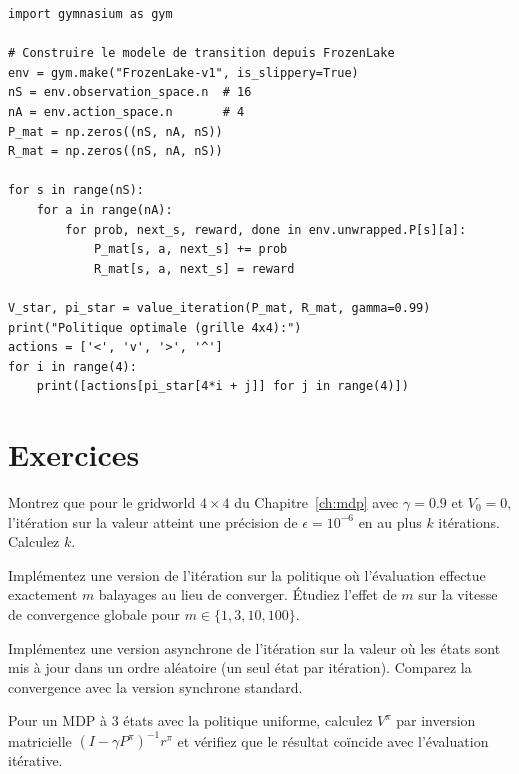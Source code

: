 \begin{codeblock}[title=\textbf{Application au FrozenLake}]
\begin{verbatim}
import gymnasium as gym

# Construire le modele de transition depuis FrozenLake
env = gym.make("FrozenLake-v1", is_slippery=True)
nS = env.observation_space.n  # 16
nA = env.action_space.n       # 4
P_mat = np.zeros((nS, nA, nS))
R_mat = np.zeros((nS, nA, nS))

for s in range(nS):
    for a in range(nA):
        for prob, next_s, reward, done in env.unwrapped.P[s][a]:
            P_mat[s, a, next_s] += prob
            R_mat[s, a, next_s] = reward

V_star, pi_star = value_iteration(P_mat, R_mat, gamma=0.99)
print("Politique optimale (grille 4x4):")
actions = ['<', 'v', '>', '^']
for i in range(4):
    print([actions[pi_star[4*i + j]] for j in range(4)])
\end{verbatim}
\end{codeblock}

\section{Exercices}

\begin{exercice}
Montrez que pour le gridworld $4 \times 4$ du Chapitre~\ref{ch:mdp} avec
$\gamma = 0.9$ et $V_0 = 0$, l'it\'eration sur la valeur atteint une
pr\'ecision de $\epsilon = 10^{-6}$ en au plus $k$ it\'erations. Calculez $k$.
\end{exercice}

\begin{exercice}
Impl\'ementez une version de l'it\'eration sur la politique o\`u l'\'evaluation
effectue exactement $m$ balayages au lieu de converger. \'Etudiez l'effet de $m$
sur la vitesse de convergence globale pour $m \in \{1, 3, 10, 100\}$.
\end{exercice}

\begin{exercice}
Impl\'ementez une version asynchrone de l'it\'eration sur la valeur o\`u les
\'etats sont mis \`a jour dans un ordre al\'eatoire (un seul \'etat par it\'eration).
Comparez la convergence avec la version synchrone standard.
\end{exercice}

\begin{exercice}
Pour un MDP \`a 3 \'etats avec la politique uniforme, calculez $V^\pi$ par
inversion matricielle $(I - \gamma P^\pi)^{-1} r^\pi$ et v\'erifiez que
le r\'esultat co\"incide avec l'\'evaluation it\'erative.
\end{exercice}
